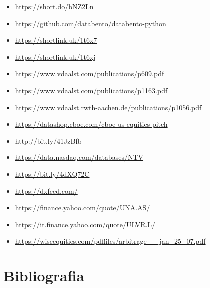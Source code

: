 \documentclass[10pt,final]{article}
\begin{document}
\begin{itemize}
\item \url{https://short.do/bNZ2Ln}
\item \url{https://github.com/databento/databento-python}
\item \url{https://shortlink.uk/1t6x7}
\item \url{https://shortlink.uk/1t6xj}
\item \url{https://www.vdaalst.com/publications/p609.pdf}
\item \url{https://www.vdaalst.com/publications/p1163.pdf}
\item \url{https://www.vdaalst.rwth-aachen.de/publications/p1056.pdf}
\item \url{https://datashop.cboe.com/cboe-us-equities-pitch}
\item \url{http://bit.ly/41JzBfb}
\item \url{https://data.nasdaq.com/databases/NTV}
\item \url{https://bit.ly/4dXQ72C}
\item \url{https://dxfeed.com/}
\item \url{https://finance.yahoo.com/quote/UNA.AS/}
\item \url{https://it.finance.yahoo.com/quote/ULVR.L/}
\item \url{https://wiseequities.com/pdffiles/arbitrage_-_jan_25_07.pdf}

\end{itemize}

\section{Bibliografia}
\end{document}
